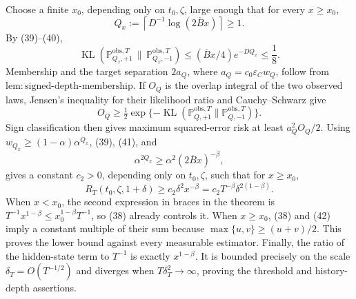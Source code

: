Choose a finite \(x_0\), depending only on \(t_0,\zeta\), large enough that for every \(x\ge x_0\),
\[
 Q_x:=\left\lceil D^{-1}\log(2\overline Bx)\right\rceil\ge1.
\]
By (39)--(40),
\[
 \operatorname{KL}(\mathbb P_{Q_x,+1}^{\mathrm{obs},T}\,\|\,
                    \mathbb P_{Q_x,-1}^{\mathrm{obs},T})
 \le(\overline Bx/4)e^{-DQ_x}\le\frac18. \tag{41}
\]
Membership and the target separation \(2a_Q\), where \(a_Q=c_0\varepsilon_Cw_Q\), follow from \(\mathrm{lem{:}signed\text{-}depth\text{-}membership}\).  If \(O_Q\) is the overlap integral of the two observed laws, Jensen's inequality for their likelihood ratio and Cauchy--Schwarz give
\[
 O_Q\ge\tfrac12\exp\{-\operatorname{KL}(\mathbb P_{Q,+1}^{\mathrm{obs},T}\|
                                      \mathbb P_{Q,-1}^{\mathrm{obs},T})\}.
\]
Sign classification then gives maximum squared-error risk at least \(a_Q^2O_Q/2\).  Using
\(w_{Q_x}\ge(1-\alpha)\alpha^{Q_x}\), (39), (41), and
\[
 \alpha^{2Q_x}\ge\alpha^2(2\overline Bx)^{-\beta},
\]
gives a constant \(c_2>0\), depending only on \(t_0,\zeta\), such that for \(x\ge x_0\),
\[
 R_T(t_0,\zeta,1+\delta)
 \ge c_2\delta^2x^{-\beta}
 =c_2T^{-\beta}\delta^{2(1-\beta)}. \tag{42}
\]
When \(x<x_0\), the second expression in braces in the theorem is
\(T^{-1}x^{1-\beta}\le x_0^{1-\beta}T^{-1}\), so (38) already controls it.  When \(x\ge x_0\), (38) and (42) imply a constant multiple of their sum because \(\max\{u,v\}\ge(u+v)/2\).  This proves the lower bound against every measurable estimator.  Finally, the ratio of the hidden-state term to \(T^{-1}\) is exactly \(x^{1-\beta}\).  It is bounded precisely on the scale \(\delta_T=O(T^{-1/2})\) and diverges when \(T\delta_T^2\to\infty\), proving the threshold and history-depth assertions.
